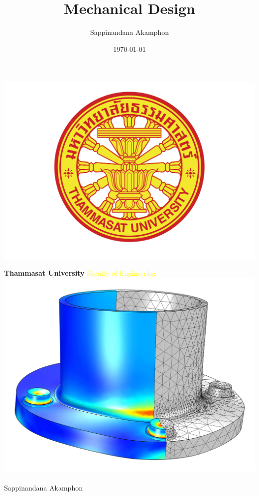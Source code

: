 \documentclass[a4paper,openany]{tufte-book}
\author{Sappinandana Akamphon}
\date{\today}
\title{Mechanical Design}
\begin{document}
\begin{titlepage}
  \pagecolor{DarkBlue}
  \includegraphics[scale=0.2]{pictures/logo-tu} \\
  \noindent
  \color{white}
  \makebox[0pt][l]{\rule{1.3\textwidth}{1pt}}
  \par
  \noindent
  \textbf{\textsf{Thammasat University}} \textcolor{yellow}{\textsf{Faculty of Engineering}}
  \vfill
  \hspace{1cm}
  \includegraphics[scale=0.23]{pictures/tube-connection}
  \vfill
  \noindent
   \\
  \vspace{1cm}
   \\
  \vspace{1cm}
  \noindent
  {\Large {Sappinandana Akamphon}}
\end{titlepage}
\end{document}

